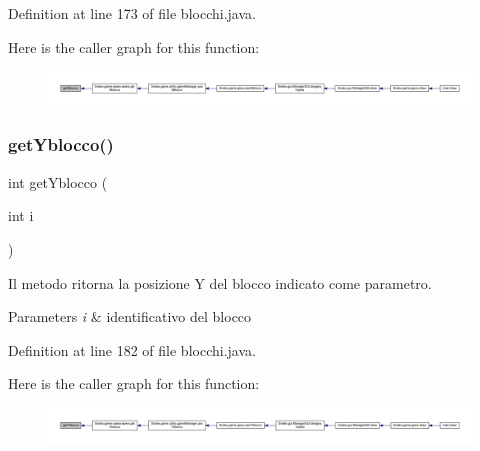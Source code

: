 Definition at line 173 of file blocchi.\+java.

Here is the caller graph for this function\+:
\nopagebreak
\begin{figure}[H]
\begin{center}
\leavevmode
\includegraphics[width=350pt]{class_snake_1_1game_1_1vipera_1_1blocchi_ac25c5b310cb26c05d5ea69485d1e155f_icgraph}
\end{center}
\end{figure}
\mbox{\label{class_snake_1_1game_1_1vipera_1_1blocchi_a4fad016a4b1de9e17b7092abd420d962}} 
\subsubsection{\texorpdfstring{get\+Yblocco()}{getYblocco()}}
{\footnotesize\ttfamily int get\+Yblocco (\begin{DoxyParamCaption}\item[{int}]{i }\end{DoxyParamCaption})}



Il metodo ritorna la posizione Y del blocco indicato come parametro. 


\begin{DoxyParams}{Parameters}
{\em i} & identificativo del blocco \\
\hline
\end{DoxyParams}


Definition at line 182 of file blocchi.\+java.

Here is the caller graph for this function\+:
\nopagebreak
\begin{figure}[H]
\begin{center}
\leavevmode
\includegraphics[width=350pt]{class_snake_1_1game_1_1vipera_1_1blocchi_a4fad016a4b1de9e17b7092abd420d962_icgraph}
\end{center}
\end{figure}
\mbox{\label{class_snake_1_1game_1_1vipera_1_1blocchi_a2fbeb7ff9ae1fc1f5c5b1a885900034c}} 
